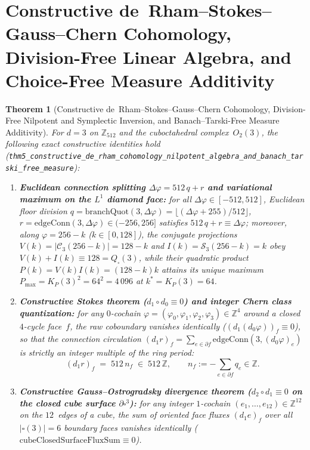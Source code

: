 \documentclass[11pt,a4paper]{article}
\theoremstyle{plain}
\newtheorem{theorem}{Theorem}[section]
\theoremstyle{definition}
\begin{document}
\section{Constructive de~Rham--Stokes--Gauss--Chern Cohomology, Division-Free Linear Algebra, and Choice-Free Measure Additivity}
\label{sec:constructive-foundations}

\begin{theorem}[Constructive de~Rham--Stokes--Gauss--Chern Cohomology, Division-Free Nilpotent and Symplectic Inversion, and Banach--Tarski-Free Measure Additivity]
\label{thm:main-5}
For $d=3$ on $\mathbb{Z}_{512}$ and the cuboctahedral complex~$O_2(3)$, the following exact constructive identities hold (\texttt{thm5\_constructive\_de\_rham\_cohomology\_nilpotent\_algebra\_and\_banach\_tarski\_free\_measure}):
\begin{enumerate}[label=\textbf{(\roman*)},leftmargin=*]
\item \textbf{Euclidean connection splitting $\Delta\varphi = 512\,q + r$ and variational maximum on the $L^1$ diamond face:}
  for all $\Delta\varphi\in[-512,512]$, Euclidean floor division $q = \mathrm{branchQuot}(3,\Delta\varphi) = \lfloor(\Delta\varphi+255)/512\rfloor$, $r = \mathrm{edgeConn}(3,\Delta\varphi)\in(-256,256]$ satisfies $512\,q + r \equiv \Delta\varphi$; moreover, along $\varphi = 256 - k$ ($k\in[0,128]$), the conjugate projections $V(k) = |\mathcal{C}_3(256-k)| = 128-k$ and $I(k) = \mathcal{S}_3(256-k) = k$ obey $V(k)+I(k)\equiv 128 = Q_\square(3)$, while their quadratic product $P(k) = V(k)I(k) = (128-k)k$ attains its unique maximum $P_{\max} = K_P(3)^2 = 64^2 = 4\,096$ at $k^* = K_P(3) = 64$.
\item \textbf{Constructive Stokes theorem ($d_1\circ d_0\equiv 0$) and integer Chern class quantization:}
  for any $0$-cochain $\varphi = (\varphi_0,\varphi_1,\varphi_2,\varphi_3)\in\mathbb{Z}^4$ around a closed $4$-cycle face~$f$, the raw coboundary vanishes identically ($(d_1(d_0\varphi))_f \equiv 0$), so that the connection circulation $(d_1 r)_f = \sum_{e\in\partial f}\mathrm{edgeConn}(3,(d_0\varphi)_e)$ is strictly an integer multiple of the ring period:
  \[
    (d_1 r)_f \;=\; 512\,n_f \;\in\; 512\,\mathbb{Z},\qquad
    n_f := -\sum_{e\in\partial f} q_e \in \mathbb{Z}.
  \]
\item \textbf{Constructive Gauss--Ostrogradsky divergence theorem ($d_2\circ d_1\equiv 0$ on the closed cube surface $\partial\square^3$):}
  for any integer $1$-cochain $(e_1,\dots,e_{12})\in\mathbb{Z}^{12}$ on the $12$~edges of a cube, the sum of oriented face fluxes $(d_1 e)_f$ over all $|\square(3)|=6$ boundary faces vanishes identically ($\mathrm{cubeClosedSurfaceFluxSum}\equiv 0$).

\end{enumerate}
\end{theorem}
\end{document}
